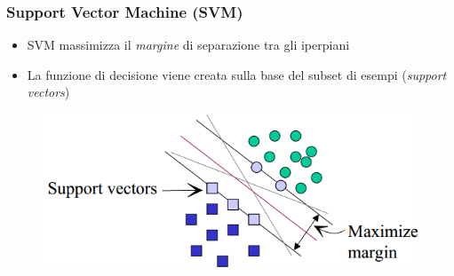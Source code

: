 \documentclass{beamer}
\begin{document}
\begin{frame}
	\frametitle{Support Vector Machine (SVM)}
	\begin{itemize}
		\item SVM massimizza il \emph{margine} di separazione tra gli iperpiani
		\item La funzione di decisione viene creata sulla base del subset di esempi (\emph{support vectors})
	\end{itemize}
	\begin{figure}[htb]
		\vspace{-0.2cm}
		\includegraphics[width=.80\textwidth]{figure/svm.png}
	\end{figure}
\end{frame}
\end{document}
